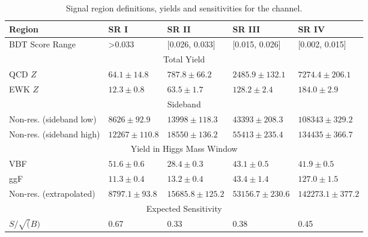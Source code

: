 \begin{table}[htpb]
\centering
\begin{tabular}{|l|l|l|l|l|}
\hline
Region                       & SR I                & SR II                      & SR III                     & SR IV                      \\ \hline
BDT Score Range              & \textgreater0.033   & [0.026, 0.033]             & [0.015, 0.026]             & [0.002, 0.015]             \\ \hline
\multicolumn{5}{|c|}{Total Yield}                                                                                                         \\ \hline
QCD $Z$                      & $64.1 \pm 14.8$   & $787.8 \pm 66.2$         & $2485.9 \pm 132.1$       & $7274.4 \pm 206.1$       \\ \cline{2-5} 
EWK $Z$                      & $12.3 \pm 0.8$    & $63.5 \pm 1.7$           & $128.2 \pm 2.4$          & $184.0 \pm 2.9$          \\ \hline
\multicolumn{5}{|c|}{Sideband}                                                                                                            \\ \hline
Non-res. (sideband low)  & $8626 \pm 92.9$    & $13998 \pm 118.3 $        & $43393 \pm 208.3$         & $108343 \pm 329.2$        \\ \cline{2-5} 
Non-res. (sideband high) & $12267 \pm 110.8$  & $18550 \pm 136.2$         & $55413 \pm 235.4$         & $134435 \pm 366.7$        \\ \hline
\multicolumn{5}{|c|}{Yield in Higgs Mass Window}                                                                                          \\ \hline
VBF                          & $51.6 \pm 0.6$    & $28.4\pm 0.3$            & $43.1\pm 0.5$            & $41.9\pm 0.5$            \\ \cline{2-5} 
ggF                          & $11.3 \pm 0.4$    & $13.2 \pm 0.4$           & $43.4 \pm 1.4$           & $127.0 \pm 1.5$          \\ \cline{2-5} 
Non-res. (extrapolated)   & $8797.1 \pm 93.8$ & $15685.8\pm 125.2$       & $53156.7\pm 230.6$       & $142273.1\pm 377.2$      \\ \hline
\multicolumn{5}{|c|}{Expected Sensitivity}                                                                                                \\ \hline
$S/ \sqrt(B)$                & 0.67                & 0.33                       & 0.38                       & 0.45                       \\ \hline
\end{tabular}
\caption{Signal region definitions, yields and sensitivities for the \fourcentral channel. }
\label{tab:BDTReg4cen_alt}

\end{table}


